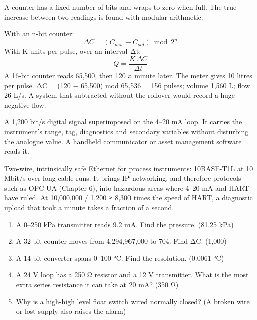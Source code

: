 A counter has a fixed number of bits and wraps to zero when full. The true increase between two readings is found with modular arithmetic.

 With an n-bit counter:
\[ \Delta C = (C_{new} - C_{old}) \bmod 2^n \]
 With K units per pulse, over an interval Δt:
\[ Q = \frac{K\,\Delta C}{\Delta t} \]
 A 16-bit counter reads 65,500, then 120 a minute later. The meter gives 10 litres per pulse. ΔC = (120 − 65,500) mod 65,536 = 156 pulses; volume 1,560 L; flow 26 L/s. A system that subtracted without the rollover would record a huge negative flow.

 A 1,200 bit/s digital signal superimposed on the 4–20 mA loop. It carries the instrument's range, tag, diagnostics and secondary variables without disturbing the analogue value. A handheld communicator or asset management software reads it.

 Two-wire, intrinsically safe Ethernet for process instruments: 10BASE-T1L at 10 Mbit/s over long cable runs. It brings IP networking, and therefore protocols such as OPC UA (Chapter 6), into hazardous areas where 4–20 mA and HART have ruled. At 10,000,000 / 1,200 ≈ 8,300 times the speed of HART, a diagnostic upload that took a minute takes a fraction of a second.

\begin{enumerate}
\item A 0–250 kPa transmitter reads 9.2 mA. Find the pressure. (81.25 kPa)
\item A 32-bit counter moves from 4,294,967,000 to 704. Find ΔC. (1,000)
\item A 14-bit converter spans 0–100 °C. Find the resolution. (0.0061 °C)
\item A 24 V loop has a 250 Ω resistor and a 12 V transmitter. What is the most extra series resistance it can take at 20 mA? (350 Ω)
\item Why is a high-high level float switch wired normally closed? (A broken wire or lost supply also raises the alarm)
\end{enumerate}
